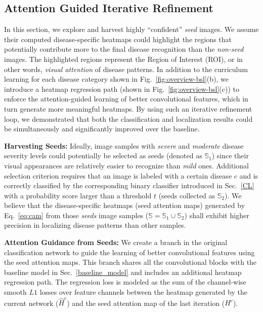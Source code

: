 \documentclass[runningheads,a4paper]{llncs}
\begin{document}
\subsection{Attention Guided Iterative Refinement}
\label{AGL}

In this section, we explore and harvest highly ``confident'' \textit{seed} images. We assume their computed disease-specific heatmaps could highlight the regions that potentially contribute more to the final disease recognition than the \textit{non-seed} images. The highlighted regions represent the Region of Interest (ROI), or in other words, \textit{visual attention} of disease patterns. In addition to the curriculum learning for each disease category shown in Fig.~\ref{fig:overview-bsl}(b), we introduce a heatmap regression path (shown in Fig.~\ref{fig:overview-bsl}(c)) to enforce the attention-guided learning of better convolutional features, which in turn generate more meaningful heatmaps. By using such an iterative refinement loop, we demonstrated that both the classification and localization results could be simultaneously and significantly improved over the baseline.

\textbf{Harvesting Seeds:}
Ideally, image samples with \textit{severe} and \textit{moderate} disease severity levels could potentially be selected as seeds (denoted as $\mathbb{S}_1$) since their visual appearances are relatively easier to recognize than \textit{mild} ones. Additional selection criterion requires that an image is labeled with a certain disease $c$ and is correctly classified by the corresponding binary classifier introduced in Sec.~\ref{CL} with a probability score larger than a threshold $t$ (seeds collected as $\mathbb{S}_2$). We believe that the disease-specific heatmaps (seed attention maps) generated by Eq.~\eqref{eq:cam} from those \textit{seeds} image samples ($\mathbb{S} = \mathbb{S}_1 \cup \mathbb{S}_2$) shall exhibit higher precision in localizing disease patterns than other samples.

\textbf{Attention Guidance from Seeds:}
We create a branch in the original classification network to guide the learning of better convolutional features using the seed attention maps. This branch shares all the convolutional blocks with the baseline model in Sec.~\ref{baseline_model} and includes an additional heatmap regression path. The regression loss is modeled as the sum of the channel-wise smooth $L1$ losses over feature channels between the heatmap generated by the current network ($\hat{H}^{c}$) and the seed attention map of the last iteration ($H^{c}$).
\end{document}
